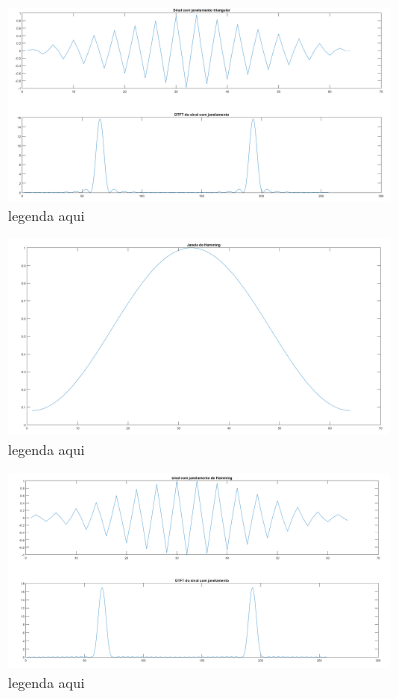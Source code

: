 \documentclass[a4paper, 12pt]{book}
\begin{document}
\begin{figure}[h]
	\centering
	\includegraphics[width=0.9\textwidth]{../figuras/f3.png}
	\caption{legenda aqui}
	\label{fig:f3}
\end{figure}

\begin{figure}[h]
	\centering
	\includegraphics[width=0.9\textwidth]{../figuras/f2.png}
	\caption{legenda aqui}
	\label{fig:f2}
\end{figure}

\begin{figure}[h]
	\centering
	\includegraphics[width=0.9\textwidth]{../figuras/f1.png}
	\caption{legenda aqui}
	\label{fig:f1}
\end{figure}
\end{document}
